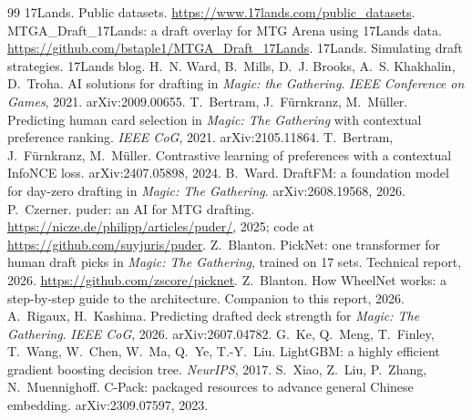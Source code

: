 \documentclass[10pt,letterpaper]{article}
\begin{document}
\small
\begin{thebibliography}{99}\setlength{\itemsep}{1pt}
 17Lands. Public datasets. \url{https://www.17lands.com/public_datasets}.
 MTGA\_Draft\_17Lands: a draft overlay for MTG Arena using 17Lands data.
\url{https://github.com/bstaple1/MTGA_Draft_17Lands}.
 17Lands. Simulating draft strategies. 17Lands blog.
 H.~N. Ward, B.~Mills, D.~J. Brooks, A.~S. Khakhalin, D.~Troha. AI solutions for drafting in
\emph{Magic: the Gathering}. \emph{IEEE Conference on Games}, 2021. arXiv:2009.00655.
 T.~Bertram, J.~F\"urnkranz, M.~M\"uller. Predicting human card selection in
\emph{Magic: The Gathering} with contextual preference ranking. \emph{IEEE CoG}, 2021. arXiv:2105.11864.
 T.~Bertram, J.~F\"urnkranz, M.~M\"uller. Contrastive learning of preferences
with a contextual InfoNCE loss. arXiv:2407.05898, 2024.
 B.~Ward. DraftFM: a foundation model for day-zero drafting in \emph{Magic: The Gathering}.
arXiv:2608.19568, 2026.
 P.~Czerner. puder: an AI for MTG drafting. \url{https://nicze.de/philipp/articles/puder/}, 2025;
code at \url{https://github.com/suyjuris/puder}.
 Z.~Blanton. PickNet: one transformer for human draft picks in \emph{Magic: The Gathering},
trained on 17 sets. Technical report, 2026. \url{https://github.com/zscore/picknet}.
 Z.~Blanton. How WheelNet works: a step-by-step guide to the architecture. Companion to this
report, 2026.
 A.~Rigaux, H.~Kashima. Predicting drafted deck strength for \emph{Magic: The
Gathering}. \emph{IEEE CoG}, 2026. arXiv:2607.04782.
 G.~Ke, Q.~Meng, T.~Finley, T.~Wang, W.~Chen, W.~Ma, Q.~Ye, T.-Y.~Liu. LightGBM: a highly
efficient gradient boosting decision tree. \emph{NeurIPS}, 2017.
 S.~Xiao, Z.~Liu, P.~Zhang, N.~Muennighoff. C-Pack: packaged resources to advance general Chinese
embedding. arXiv:2309.07597, 2023.
\end{thebibliography}
\end{document}
